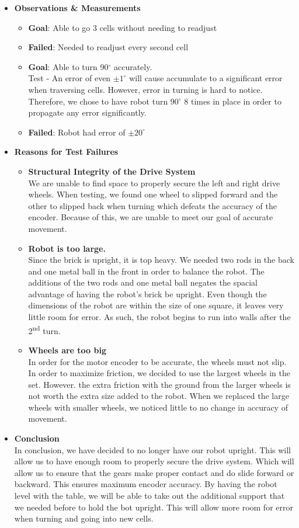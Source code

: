 \documentclass[11pt]{article}
\newcommand{\ts}{\textsuperscript}
\begin{document}
\begin{itemize}
\item \textbf{Observations \& Measurements}
	\begin{itemize}
	\item \textbf{Goal}: Able to go 3 cells without needing to readjust
	\item \textbf{Failed}: Needed to readjust every second cell
	\item \textbf{Goal}: Able to turn 90$^{\circ}$ accurately.\\
	Test - An error of even $ \pm 1^{\circ}$ will cause accumulate to a significant error when traversing cells. However, error in turning is hard to notice. Therefore, we chose to have robot turn 90$^{\circ}$ 8 times in place in order to propagate any error significantly.
	\item \textbf{Failed}: Robot had error of $ \pm 20^{\circ}$
	\end{itemize}
\item \textbf{Reasons for Test Failures}
	\begin{itemize}
	\item \textbf{Structural Integrity of the Drive System}\\
	We are unable to find space to properly secure the left and right drive wheels. When testing, we found one wheel to slipped forward and the other to slipped back when turning which defeats the accuracy of the encoder. Because of this, we are unable to meet our goal of accurate movement.
	\item \textbf{Robot is too large.}\\
	Since the brick is upright, it is top heavy. We needed two rods in the back and one metal ball in the front in order to balance the robot. The additions of the two rods and one metal ball negates the spacial advantage of having the robot's brick be upright. Even though the dimensions of the robot are within the size of one square, it leaves very little room for error. As such, the robot begins to run into walls after the 2\ts{nd} turn.
	\item \textbf{Wheels are too big}\\
	In order for the motor encoder to be accurate, the wheels must not slip. In order to maximize friction, we decided to use the largest wheels in the set. However. the extra friction with the ground from the larger wheels is not worth the extra size added to the robot. When we replaced the large wheels with smaller wheels, we noticed little to no change in accuracy of movement.
	\end{itemize}
\item \textbf{Conclusion}\\
In conclusion, we have decided to no longer have our robot upright. This will allow us to have enough room to properly secure the drive system. Which will allow us to ensure that the gears make proper contact and do slide forward or backward. This ensures maximum encoder accuracy. By having the robot level with the table, we will be able to take out the additional support that we needed before to hold the bot upright. This will allow more room for error when turning and going into new cells.
\end{itemize}
\newpage
\end{document}
